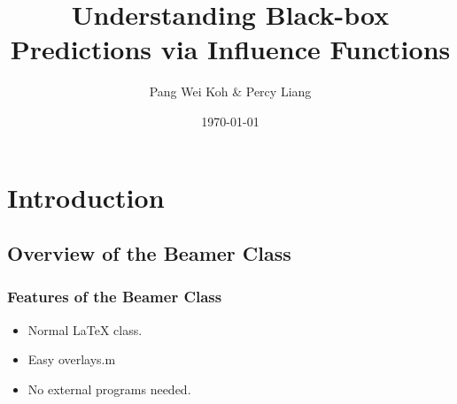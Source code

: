 \documentclass[UTF8]{beamer}
\title{Understanding Black-box Predictions via Influence Functions}
\author{Pang Wei Koh \& Percy Liang}
\date{\today}
\begin{document}
\frame{\titlepage}

\section[Outline]{}
\frame{\tableofcontents}

\section{Introduction}
\subsection{Overview of the Beamer Class}
\frame
{
  \frametitle{Features of the Beamer Class}

  \begin{itemize}
  \item<1-> Normal LaTeX class.
  \item<2-> Easy overlays.m
  \item<3-> No external programs needed.      
  \end{itemize}
}
\end{document}
